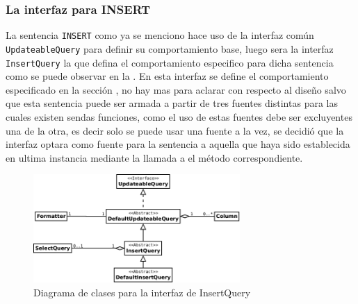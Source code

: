 \subsubsection{La interfaz para INSERT}

La sentencia \verb=INSERT= como ya se menciono hace uso de la interfaz común \verb=UpdateableQuery= para definir su comportamiento base, luego sera la interfaz \verb=InsertQuery= la que defina el comportamiento especifico para dicha sentencia como se puede observar en la . En esta interfaz se define el comportamiento especificado en la sección \pageref{especificacion:dialectos:insert}, no hay mas para aclarar con respecto al diseño salvo que esta sentencia puede ser armada a partir de tres fuentes distintas para las cuales existen sendas funciones, como el uso de estas fuentes debe ser excluyentes una de la otra, es decir solo se puede usar una fuente a la vez, se decidió que la interfaz optara como fuente para la sentencia a aquella que haya sido establecida en ultima instancia mediante la llamada a el método correspondiente.

\begin{figure}
  \centering
    \includegraphics[width=0.7\textwidth]{figuras/jdbgm-dc-insert.png}
  \caption{Diagrama de clases para la interfaz de InsertQuery}
  \label{fig:dc-insertquery}
\end{figure}

